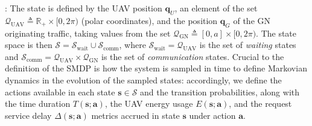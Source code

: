 \documentclass[10pt, twocolumn]{IEEEtran}
\theoremstyle{plain}
\theoremstyle{definition}
\theoremstyle{remark}
\begin{document}
: The state is defined by the UAV position $\mathbf{q}_{U}$, an element of the set $\mathcal{Q}_{\mathrm{UAV}}{\triangleq}\mathbb{R}_{+}{\times}[0,2\pi)$ (polar coordinates), and the position $\mathbf{q}_{G}$ of the GN originating traffic, taking values from the set  $\mathcal{Q}_{\mathrm{GN}}{\triangleq}[0,a]{\times}[0,2\pi)$. The state space is then $\mathcal{S}{=}\mathcal{S}_{\mathrm{wait}}\cup\mathcal{S}_{\mathrm{comm}}$, where $\mathcal{S}_{\mathrm{wait}}{=}\mathcal{Q}_{\mathrm{UAV}}$ is the set of \emph{waiting} states and $\mathcal{S}_{\mathrm{comm}}{=}\mathcal{Q}_{\mathrm{UAV}}{\times}\mathcal{Q}_{\mathrm{GN}}$ is the set of \emph{communication} states. Crucial to the definition of the SMDP is how the system is sampled in time to define Markovian dynamics in the evolution of the sampled states: accordingly, we define the actions available in each state $\mathbf{s}{\in}\mathcal{S}$ and the transition probabilities, along with the time duration $T(\mathbf{s};\mathbf{a})$, the UAV energy usage $E(\mathbf{s};\mathbf{a})$, and the request service delay $\Delta(\mathbf{s};\mathbf{a})$ metrics accrued in state $\mathbf{s}$ under action $\mathbf{a}$.
\end{document}

